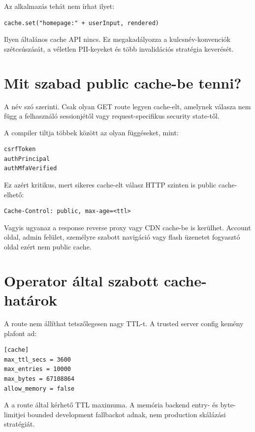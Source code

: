 Az alkalmazás tehát nem írhat ilyet:

\begin{lstlisting}
cache.set("homepage:" + userInput, rendered)
\end{lstlisting}

Ilyen általános cache API nincs. Ez megakadályozza a kulcsnév-konvenciók szétcsúszását, a véletlen PII-keyeket és több invalidációs stratégia keverését.

\section{Mit szabad public cache-be tenni?}

A  név szó szerinti. Csak olyan GET route legyen cache-elt, amelynek válasza nem függ a felhasználó sessionjétől vagy request-specifikus security state-től.

A compiler tiltja többek között az olyan függéseket, mint:

\begin{lstlisting}
csrfToken
authPrincipal
authMfaVerified
\end{lstlisting}

Ez azért kritikus, mert sikeres cache-elt válasz HTTP szinten is public cache-elhető:

\begin{lstlisting}
Cache-Control: public, max-age=<ttl>
\end{lstlisting}

Vagyis ugyanaz a response reverse proxy vagy CDN cache-be is kerülhet. Account oldal, admin felület, személyre szabott navigáció vagy flash üzenetet fogyasztó oldal ezért nem public cache.

\section{Operator által szabott cache-határok}

A route nem állíthat tetszőlegesen nagy TTL-t. A trusted server config kemény plafont ad:

\begin{lstlisting}
[cache]
max_ttl_secs = 3600
max_entries = 10000
max_bytes = 67108864
allow_memory = false
\end{lstlisting}

A  a route által kérhető TTL maximuma. A memória backend entry- és byte-limitjei bounded development fallbackot adnak, nem production skálázási stratégiát.


